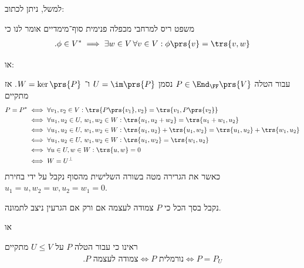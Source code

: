 \documentclass[a4paper,10pt,twoside,openany]{article}
\renewenvironment{quote}
  {\begin{tcolorbox}[
      colback=white,
      colframe=black,
      boxrule=0.5pt,
      left=2mm,
      right=2mm,
      top=1mm,
      bottom=1mm
    ]}
  {\end{tcolorbox}}
\begin{document}
למשל, ניתן לכתוב:
\begin{quote}
משפט ריס למרחבי מכפלה פנימית סוף־מימדיים אומר לנו כי
\begin{align*}
\text{.} \phi \in V^* \implies \exists w \in V \, \forall v \in V: \phi\prs{v} = \trs{v, w}
\end{align*}
\end{quote}
או:
\begin{quote}
עבור הטלה
$P \in \End_\FF\prs{V}$
נסמן
$U = \im\prs{P}$
ו־%
$W = \ker\prs{P}$.
אז מתקיים
\begin{align*}
P = P^*
&\iff
\forall v_1, v_2 \in V: \trs{P\prs{v_1}, v_2} = \trs{v_1, P\prs{v_2}}
\\&\iff
\forall u_1, u_2 \in U, \, w_1, w_2 \in W: \trs{u_1, u_2 + w_2} = \trs{u_1 + w_1, u_2}
\\&\iff
\forall u_1, u_2 \in U, \, w_1, w_2 \in W: \trs{u_1, u_2} + \trs{u_1, w_2} = \trs{u_1, u_2} + \trs{w_1, u_2}
\\&\iff
\forall u_1, u_2 \in U, \, w_1, w_2 \in W: \trs{u_1, w_2} = \trs{w_1, u_2}
\\&\iff
\forall u \in U, w \in W: \trs{u,w} = 0
\\&\iff
W = U^\perp
\end{align*}
כאשר את הגרירה מטה בשורה השלישית מהסוף נקבל על ידי בחירת
$u_1 = u, w_2 = w, u_2 = w_1 = 0$.

נקבל בסך הכל כי
$P$
צמודה לעצמה אם ורק אם הגרעין ניצב לתמונה.
\end{quote}
או
\begin{quote}
ראינו כי עבור הטלה
$P$
על
$U \leq V$
מתקיים
\begin{align*}
\text{.} \text{$P$ צמודה לעצמה} \iff \text{$P$ נורמלית} \iff \text{$P = P_U$}
\end{align*}
\end{quote}
\end{document}
